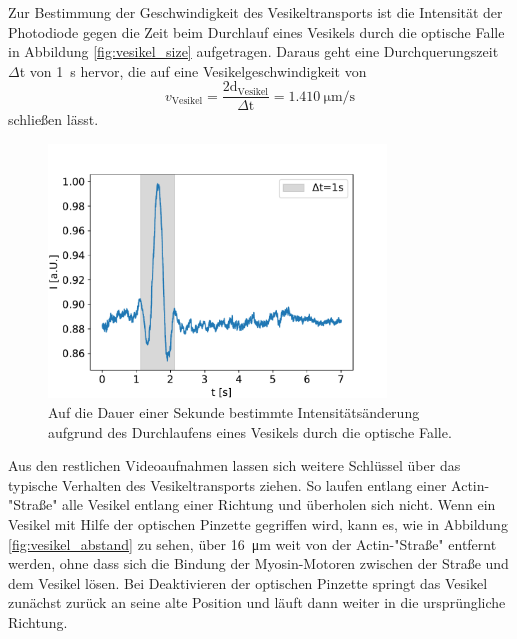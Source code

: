         \FloatBarrier
        \newpage
        Zur Bestimmung der Geschwindigkeit des Vesikeltransports ist die Intensität der Photodiode gegen die Zeit beim Durchlauf eines Vesikels durch die optische Falle in Abbildung 
        \ref{fig:vesikel_size} aufgetragen. Daraus geht eine Durchquerungszeit $\Delta$t von \SI{1}{\second} hervor, die auf eine Vesikelgeschwindigkeit von 
        \begin{equation*}
            v_{\text{Vesikel}} = \frac{2\text{d}_\text{Vesikel}}{\Delta\text{t}} = \SI{1.410}{\micro\metre\per\second}
        \end{equation*}
        schließen lässt.
        \FloatBarrier
        \begin{figure}[h]
        \centering
        \includegraphics[width = 0.8\textwidth]{v_vesikel.pdf}
        \caption{Auf die Dauer einer Sekunde bestimmte Intensitätsänderung aufgrund des Durchlaufens eines Vesikels durch die optische Falle.}
        \label{fig:v_vesikel}
        \end{figure}
        \FloatBarrier
        \newpage
        Aus den restlichen Videoaufnahmen lassen sich weitere Schlüssel über das typische Verhalten des Vesikeltransports ziehen. So laufen entlang einer Actin-"Straße" alle Vesikel entlang einer Richtung
        und überholen sich nicht. Wenn ein Vesikel mit Hilfe der optischen Pinzette gegriffen wird, kann es, wie in Abbildung \ref{fig:vesikel_abstand} zu sehen, über \SI{16}{\micro\metre} weit von der 
        Actin-"Straße" entfernt werden, ohne dass sich die Bindung der Myosin-Motoren zwischen der Straße und dem Vesikel lösen. Bei Deaktivieren der optischen Pinzette springt das Vesikel zunächst zurück 
        an seine alte Position und läuft dann weiter in die ursprüngliche Richtung. 
